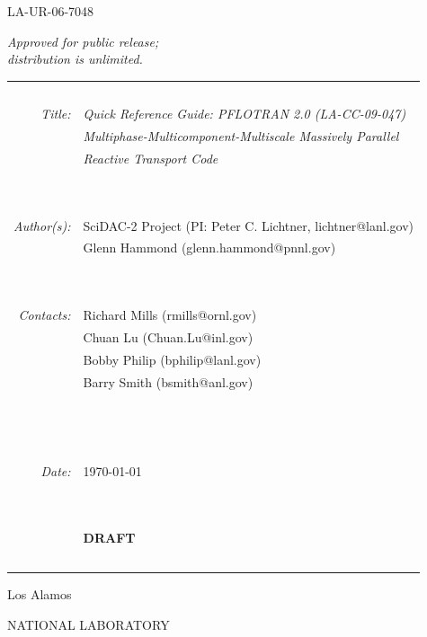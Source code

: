 \documentclass[12pt]{article}
\newcommand{\bc}{\begin{center}}
\newcommand{\ec}{\end{center}}
\begin{document}
\noindent
{\large\sffamily LA-UR-06-7048}

\medskip

\noindent
\scriptsize
{\em Approved for public release;}\\
{\em distribution is unlimited.}

\normalsize

\bc
\begin{tabular}{r|l}
~ & ~\\
{\em Title:} & {\sl Quick Reference Guide: PFLOTRAN 2.0 (LA-CC-09-047)}\\
~ & {\sl Multiphase-Multicomponent-Multiscale Massively Parallel} \\
~ & {\sl Reactive Transport Code}\\
~ & ~\\
~ & ~\\
{\em Author(s):} & SciDAC-2 Project (PI: Peter C. Lichtner, lichtner@lanl.gov)\\
~  & Glenn Hammond (glenn.hammond@pnnl.gov)\\
~ & ~\\
~ & ~\\
{\em Contacts:}  & Richard Mills (rmills@ornl.gov)\\
~ & Chuan Lu (Chuan.Lu@inl.gov)\\
~ & Bobby Philip (bphilip@lanl.gov)\\
~ & Barry Smith (bsmith@anl.gov)\\
~ & \\%
~ & ~\\
~ & ~\\
{\em Date:} & \today \\
~ & ~\\
~ & ~\\
~ & {\bf \huge DRAFT}\\
~ & ~\\
\end{tabular}
\ec

\vfill

\noindent
{\Huge\sffamily Los Alamos}

\vspace{-8pt}

\noindent
{\sffamily NATIONAL LABORATORY}
\end{document}
